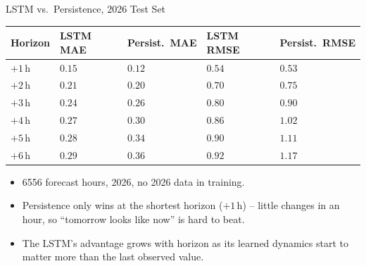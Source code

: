 \documentclass[aspectratio=169]{beamer}
\begin{document}
\begin{frame}{LSTM vs.\ Persistence, 2026 Test Set}
\footnotesize
\begin{table}
\centering
{\scriptsize
\begin{tabularx}{\linewidth}{|>{\centering\arraybackslash}X|>{\centering\arraybackslash}X|>{\centering\arraybackslash}X|>{\centering\arraybackslash}X|>{\centering\arraybackslash}X|}
\hline
\textbf{Horizon} & \textbf{LSTM MAE} & \textbf{Persist.\ MAE} & \textbf{LSTM RMSE} & \textbf{Persist.\ RMSE} \\
\hline
$+1$\,h & $0.15$ & $\mathbf{0.12}$ & $0.54$ & $\mathbf{0.53}$ \\
\hline
$+2$\,h & $0.21$ & $\mathbf{0.20}$ & $\mathbf{0.70}$ & $0.75$ \\
\hline
$+3$\,h & $\mathbf{0.24}$ & $0.26$ & $\mathbf{0.80}$ & $0.90$ \\
\hline
$+4$\,h & $\mathbf{0.27}$ & $0.30$ & $\mathbf{0.86}$ & $1.02$ \\
\hline
$+5$\,h & $\mathbf{0.28}$ & $0.34$ & $\mathbf{0.90}$ & $1.11$ \\
\hline
$+6$\,h & $\mathbf{0.29}$ & $0.36$ & $\mathbf{0.92}$ & $1.17$ \\
\hline
\end{tabularx}}
\end{table}
\begin{itemize}
  \item 6556 forecast hours, 2026, no 2026 data in training.
  \item Persistence only wins at the shortest horizon ($+1$\,h) -- little
        changes in an hour, so ``tomorrow looks like now'' is hard to beat.
  \item The LSTM's advantage grows with horizon as its learned dynamics
        start to matter more than the last observed value.
\end{itemize}
\end{frame}
\end{document}
